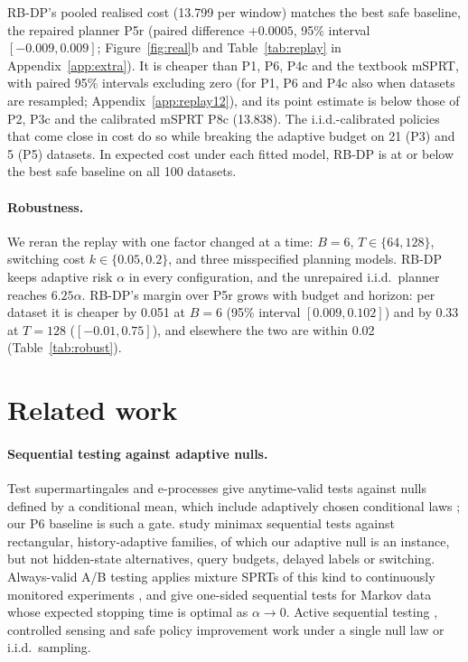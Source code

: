 \documentclass{article}
\theoremstyle{plain}
\theoremstyle{definition}
\theoremstyle{remark}
\begin{document}
RB-DP's pooled realised cost (13.799 per window) matches the best safe baseline, the repaired planner P5r (paired difference $+0.0005$, 95\% interval $[-0.009,0.009]$; Figure~\ref{fig:real}b and Table~\ref{tab:replay} in Appendix~\ref{app:extra}). It is cheaper than P1, P6, P4c and the textbook mSPRT, with paired 95\% intervals excluding zero (for P1, P6 and P4c also when datasets are resampled; Appendix~\ref{app:replay12}), and its point estimate is below those of P2, P3c and the calibrated mSPRT P8c (13.838). The i.i.d.-calibrated policies that come close in cost do so while breaking the adaptive budget on 21 (P3) and 5 (P5) datasets. In expected cost under each fitted model, RB-DP is at or below the best safe baseline on all 100 datasets.

\paragraph{Robustness.} We reran the replay with one factor changed at a time: $B=6$, $T\in\{64,128\}$, switching cost $k\in\{0.05,0.2\}$, and three misspecified planning models. RB-DP keeps adaptive risk $\alpha$ in every configuration, and the unrepaired i.i.d.\ planner reaches $6.25\alpha$. RB-DP's margin over P5r grows with budget and horizon: per dataset it is cheaper by 0.051 at $B=6$ (95\% interval $[0.009,0.102]$) and by 0.33 at $T=128$ ($[-0.01,0.75]$), and elsewhere the two are within 0.02 (Table~\ref{tab:robust}).


\section{Related work}
\label{sec:related}

\paragraph{Sequential testing against adaptive nulls.} Test supermartingales and e-processes give anytime-valid tests against nulls defined by a conditional mean, which include adaptively chosen conditional laws \citep{ramdas2023gametheoretic,waudbysmith2024betting,howard2021timeuniform,ville1939etude}; our P6 baseline is such a gate. \citet{fauss2020minimax} study minimax sequential tests against rectangular, history-adaptive families, of which our adaptive null is an instance, but not hidden-state alternatives, query budgets, delayed labels or switching. Always-valid A/B testing applies mixture SPRTs of this kind to continuously monitored experiments \citep{johari2022always}, and \citet{sethi2026asymptotically} give one-sided sequential tests for Markov data whose expected stopping time is optimal as $\alpha\to0$. Active sequential testing \citep{naghshvar2013active}, controlled sensing \citep{nitinawarat2013controlled} and safe policy improvement \citep{wu2016conservative,thomas2015high} work under a single null law or i.i.d.\ sampling.
\end{document}

